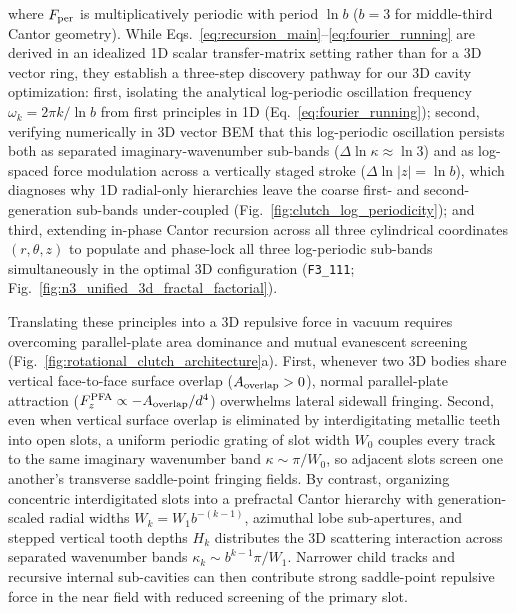 \documentclass[pdflatex,sn-nature]{sn-jnl}
\begin{document}
where $F_{\rm per}$ is multiplicatively periodic with period $\ln b$ ($b=3$ for middle-third Cantor geometry). While Eqs.~\eqref{eq:recursion_main}--\eqref{eq:fourier_running} are derived in an idealized 1D scalar transfer-matrix setting rather than for a 3D vector ring, they establish a three-step discovery pathway for our 3D cavity optimization: first, isolating the analytical log-periodic oscillation frequency $\omega_k = 2\pi k/\ln b$ from first principles in 1D (Eq.~\ref{eq:fourier_running}); second, verifying numerically in 3D vector BEM that this log-periodic oscillation persists both as separated imaginary-wavenumber sub-bands ($\Delta\ln\kappa \approx \ln 3$) and as log-spaced force modulation across a vertically staged stroke ($\Delta\ln|z| = \ln b$), which diagnoses why 1D radial-only hierarchies leave the coarse first- and second-generation sub-bands under-coupled (Fig.~\ref{fig:clutch_log_periodicity}); and third, extending in-phase Cantor recursion across all three cylindrical coordinates $(r, \theta, z)$ to populate and phase-lock all three log-periodic sub-bands simultaneously in the optimal 3D configuration (\texttt{F3\_111}; Fig.~\ref{fig:n3_unified_3d_fractal_factorial}).

Translating these principles into a 3D repulsive force in vacuum requires overcoming parallel-plate area dominance and mutual evanescent screening (Fig.~\ref{fig:rotational_clutch_architecture}a). First, whenever two 3D bodies share vertical face-to-face surface overlap ($A_{\rm overlap} > 0$), normal parallel-plate attraction ($F_z^{\rm PFA} \propto -A_{\rm overlap}/d^4$) overwhelms lateral sidewall fringing. Second, even when vertical surface overlap is eliminated by interdigitating metallic teeth into open slots\cite{levin2010}, a uniform periodic grating of slot width $W_0$ couples every track to the same imaginary wavenumber band $\kappa \sim \pi/W_0$, so adjacent slots screen one another's transverse saddle-point fringing fields. By contrast, organizing concentric interdigitated slots into a prefractal Cantor hierarchy with generation-scaled radial widths $W_k = W_1 b^{-(k-1)}$, azimuthal lobe sub-apertures, and stepped vertical tooth depths $H_k$ distributes the 3D scattering interaction across separated wavenumber bands $\kappa_k \sim b^{k-1}\pi/W_1$. Narrower child tracks and recursive internal sub-cavities can then contribute strong saddle-point repulsive force in the near field with reduced screening of the primary slot.
\end{document}
